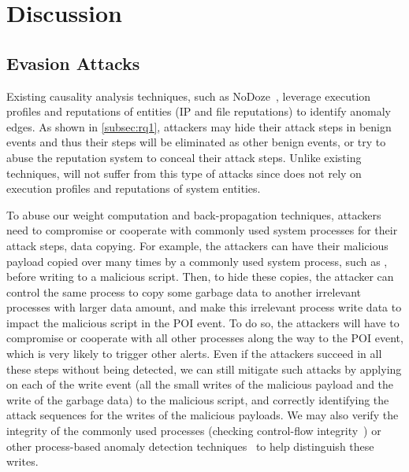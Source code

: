 \section{Discussion}
\label{sec:discussion}


\subsection{Evasion Attacks}
Existing causality analysis techniques, such as NoDoze~\cite{hassan2019nodoze}, leverage execution profiles and reputations of entities (\eg IP and file reputations) to identify anomaly edges.
As shown in \cref{subsec:rq1}, attackers may hide their attack steps in benign events and thus their steps will be eliminated as other benign events, or try to abuse the reputation system to conceal their attack steps.
Unlike existing techniques, \tool will not suffer from this type of attacks since \tool does not rely on execution profiles and reputations of system entities.

To abuse our weight computation and back-propagation techniques, attackers need to compromise or cooperate with commonly used system processes for their attack steps, \eg data copying. 
For example, the attackers can have their malicious payload copied over many times by a commonly used system process, such as , before writing to a malicious script.
Then, to hide these copies, the attacker can control the same process to copy some garbage data to another irrelevant processes with larger data amount, and make this irrelevant process write data to impact the malicious script in the POI event.
To do so, the attackers will have to compromise or cooperate with all other processes along the way to the POI event, which is very likely to trigger other alerts.
Even if the attackers succeed in all these steps without being detected, we can still mitigate such attacks by applying \tool on each of the write event (\ie all the small writes of the malicious payload and the write of the garbage data) to the malicious script, and correctly identifying the attack sequences for the writes of the malicious payloads.
We may also verify the integrity of the commonly used processes (\eg checking control-flow integrity~\cite{cfi,cfi2}) or other process-based anomaly detection techniques~\cite{processanomaly,processanomaly2} to help distinguish these writes.

